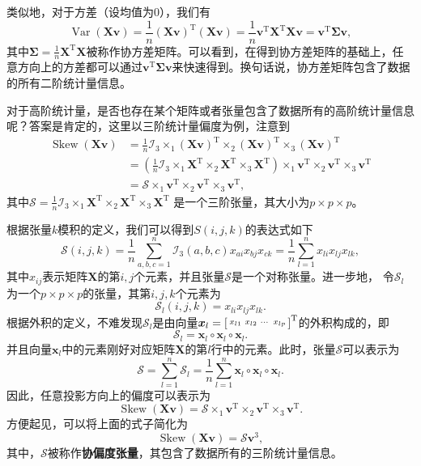 类似地，对于方差（设均值为0），我们有
\[
    \operatorname{Var}(\mathbf{X} \bm{v}) = \frac{1}{n} \left( \mathbf{X} \bm{v} \right)^{\mathrm{T}} \left( \mathbf{X} \bm{v} \right) = \frac{1}{n} \bm{v}^{\mathrm{T}} \mathbf{X}^{\mathrm{T}} \mathbf{X} \bm{v} = \bm{v}^{\mathrm{T}} \mathbf{\Sigma} \bm{v},
\]
其中\( \mathbf{\Sigma} = \frac{1}{n} \mathbf{X}^{\mathrm{T}} \mathbf{X} \)被称作协方差矩阵。可以看到，在得到协方差矩阵的基础上，任意方向上的方差都可以通过\( \bm{v}^{\mathrm{T}} \mathbf{\Sigma} \bm{v} \)来快速得到。换句话说，协方差矩阵包含了数据的所有二阶统计量信息。

对于高阶统计量，是否也存在某个矩阵或者张量包含了数据所有的高阶统计量信息呢？答案是肯定的，这里以三阶统计量偏度为例，注意到
\[
    \begin{split}
        \operatorname{Skew}(\mathbf{X} \bm{v}) & = \frac{1}{n} \mathcal{I}_3 \times_1 (\mathbf{X} \bm{v})^{\mathrm{T}} \times_2 (\mathbf{X} \bm{v})^{\mathrm{T}} \times_3 (\mathbf{X} \bm{v})^{\mathrm{T}}                                                                             \\
                                               & =  \left( \frac{1}{n} \mathcal{I}_3 \times_1 \mathbf{X}^{\mathrm{T}} \times_2 \mathbf{X}^{\mathrm{T}} \times_3 \mathbf{X}^{\mathrm{T}} \right) \times_1 \bm{v}^{\mathrm{T}} \times_2 \bm{v}^{\mathrm{T}} \times_3 \bm{v}^{\mathrm{T}} \\
                                               & = \mathcal{S} \times_1 \bm{v}^{\mathrm{T}} \times_2 \bm{v}^{\mathrm{T}} \times_3 \bm{v}^{\mathrm{T}},
    \end{split}
\]
其中\( \mathcal{S} = \frac{1}{n} \mathcal{I}_3 \times_1 \mathbf{X}^{\mathrm{T}} \times_2 \mathbf{X}^{\mathrm{T}} \times_3 \mathbf{X}^{\mathrm{T}} \) 是一个三阶张量，其大小为\( p \times p \times p \)。

根据张量\( k \)模积的定义，我们可以得到\( S(i, j, k) \)的表达式如下
\[
    \mathcal{S}(i, j, k) = \frac{1}{n} \sum_{a, b, c = 1}^n \mathcal{I}_3(a, b, c) x_{ai} x_{bj} x_{ck} = \frac{1}{n} \sum_{l=1}^n x_{li} x_{lj} x_{lk},
\]
其中\( x_{ij} \)表示矩阵\( \mathbf{X} \)的第\( i, j \)个元素，并且张量\( \mathcal{S} \)是一个对称张量。进一步地， 令\( \mathcal{S}_l \) 为一个\( p \times p \times p \)的张量，其第\( i, j, k \)个元素为
\[
    \mathcal{S}_l(i, j, k) = x_{li} x_{lj} x_{lk}.
\]
根据外积的定义，不难发现\( \mathcal{S}_l \)是由向量\( \boldsymbol{x}_l = \begin{bsmallmatrix} x_{l1} & x_{l2} & \cdots & x_{lp} \end{bsmallmatrix}^{\mathrm{T}} \)的外积构成的，即
\[
    \mathcal{S}_l = \bm{x}_l \circ \bm{x}_l \circ \bm{x}_l.
\]
并且向量\( \bm{x}_l \)中的元素刚好对应矩阵\( \mathbf{X} \)的第\( l \)行中的元素。此时，张量\( \mathcal{S} \)可以表示为
\[
    \mathcal{S} = \sum_{l=1}^n \mathcal{S}_l = \frac{1}{n} \sum_{l=1}^n \bm{x}_l \circ \bm{x}_l \circ \bm{x}_l.
\]
因此，任意投影方向上的偏度可以表示为
\[
    \operatorname{Skew}(\mathbf{X} \bm{v}) = \mathcal{S} \times_1 \bm{v}^{\mathrm{T}} \times_2 \bm{v}^{\mathrm{T}} \times_3 \bm{v}^{\mathrm{T}}.
\]
方便起见，可以将上面的式子简化为
\[
    \operatorname{Skew}(\mathbf{X} \bm{v}) = \mathcal{S} \bm{v}^3,
\]
其中，\( \mathcal{S} \)被称作\textbf{协偏度张量}，其包含了数据所有的三阶统计量信息。

